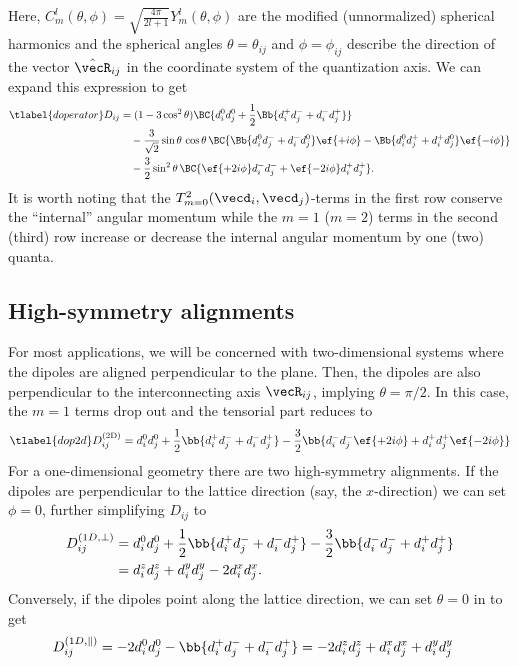 Here, $C^l_m(\theta,\phi)=\sqrt{\frac{4\pi}{2l+1}} Y^l_m(\theta,\phi)$ are the modified (unnormalized) spherical harmonics and the spherical angles $\theta = \theta_{ij}$ and $\phi = \phi_{ij}$ describe the direction of the vector $\hat{\vecR}_{ij}$ in the coordinate system of the quantization axis. We can expand this expression to get
\begin{align}\tlabel{doperator}
    D_{ij} &= (1-3\cos^2 \theta) \BC{ d_i^0 d_j^0 + \frac{1}{2}\Bb{d_i^+ d_j^- + d_i^- d_j^+} } \\
           &\quad -\frac{3}{\sqrt{2}}\sin\theta \,\cos\theta\, \BC{ \Bb{ d_i^0 d_j^- + d_i^- d_j^0 } \ef{+i\phi} - \Bb{ d_i^0 d_j^+ + d_i^+ d_j^0 } \ef{-i\phi} } \\
           &\quad -\frac{3}{2}\sin^2\theta \, \BC{ \ef{+2i\phi} d_i^- d_j^- + \ef{-2i\phi} d_i^+ d_j^+ }.
\end{align}
It is worth noting that the $T^2_{m=0}(\vecd_i, \vecd_j)$-terms in the first row conserve the ``internal'' angular momentum while the $m=1$ ($m=2$) terms in the second (third) row increase or decrease the internal angular momentum by one (two) quanta.

\subsection{High-symmetry alignments}
For most applications, we will be concerned with two-dimensional systems where the dipoles are aligned perpendicular to the plane. Then, the dipoles are also perpendicular to the interconnecting axis $\vecR_{ij}$, implying $\theta = \pi/2$. In this case, the $m=1$ terms drop out and the tensorial part reduces to
\begin{align} \tlabel{dop2d}
    D^\text{(2D)}_{ij} = d_i^0 d_j^0 + \frac{1}{2}\bb{d_i^+ d_j^- + d_i^- d_j^+} -\frac{3}{2} \bb{ d_i^- d_j^- \ef{+2i\phi} + d_i^+ d_j^+ \ef{-2i\phi} }
\end{align}
For a one-dimensional geometry there are two high-symmetry alignments. If the dipoles are perpendicular to the lattice direction (say, the $x$-direction) we can set $\phi=0$, further simplifying $D_{ij}$ to
\begin{align}
    D_{ij}^{(1D,\perp)} &= d_i^0 d_j^0 + \frac{1}{2}\bb{d_i^+ d_j^- + d_i^- d_j^+} -\frac{3}{2} \bb{d_i^- d_j^- + d_i^+ d_j^+} \\
 &= d_i^z d_j^z + d_i^y d_j^y - 2 d_i^x d_j^x.
\end{align}
Conversely, if the dipoles point along the lattice direction, we can set $\theta=0$ in  to get
\begin{align}
    D^{(1D,\parallel)}_{ij} &= -2 d_i^0 d_j^0 - \bb{d_i^+ d_j^- + d_i^- d_j^+} = -2 d_i^z d_j^z+ d_i^x d_j^x + d_i^y d_j^y
\end{align}

